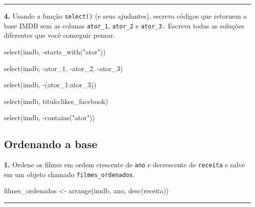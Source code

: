 \documentclass[
]{book}
\newenvironment{Shaded}{\begin{snugshade}}{\end{snugshade}}
\newcommand{\FunctionTok}[1]{\textcolor[rgb]{0.00,0.00,0.00}{#1}}
\newcommand{\NormalTok}[1]{#1}
\newcommand{\OtherTok}[1]{\textcolor[rgb]{0.56,0.35,0.01}{#1}}
\newcommand{\SpecialCharTok}[1]{\textcolor[rgb]{0.00,0.00,0.00}{#1}}
\newcommand{\StringTok}[1]{\textcolor[rgb]{0.31,0.60,0.02}{#1}}
\begin{document}
\begin{center}\rule{0.5\linewidth}{0.5pt}\end{center}

\textbf{4.} Usando a função \texttt{select()} (e seus ajudantes), escreva códigos que retornem a base IMDB sem as colunas \texttt{ator\_1}, \texttt{ator\_2} e \texttt{ator\_3.} Escreva todas as soluções diferentes que você conseguir pensar.

\begin{Shaded}
\begin{Highlighting}[]
\FunctionTok{select}\NormalTok{(imdb, }\SpecialCharTok{{-}}\FunctionTok{starts\_with}\NormalTok{(}\StringTok{"ator"}\NormalTok{))}

\FunctionTok{select}\NormalTok{(imdb, }\SpecialCharTok{{-}}\NormalTok{ator\_1, }\SpecialCharTok{{-}}\NormalTok{ator\_2, }\SpecialCharTok{{-}}\NormalTok{ator\_3)}

\FunctionTok{select}\NormalTok{(imdb, }\SpecialCharTok{{-}}\NormalTok{(ator\_1}\SpecialCharTok{:}\NormalTok{ator\_3))}

\FunctionTok{select}\NormalTok{(imdb, titulo}\SpecialCharTok{:}\NormalTok{likes\_facebook)}

\FunctionTok{select}\NormalTok{(imdb, }\SpecialCharTok{{-}}\FunctionTok{contains}\NormalTok{(}\StringTok{"ator"}\NormalTok{))}
\end{Highlighting}
\end{Shaded}

\hypertarget{ordenando-a-base-1}{%
\subsection*{Ordenando a base}\label{ordenando-a-base-1}}

\textbf{1.} Ordene os filmes em ordem crescente de \texttt{ano} e decrescente de \texttt{receita} e salve em um objeto chamado \texttt{filmes\_ordenados}.

\begin{Shaded}
\begin{Highlighting}[]
\NormalTok{filmes\_ordenados }\OtherTok{\textless{}{-}} \FunctionTok{arrange}\NormalTok{(imdb, ano, }\FunctionTok{desc}\NormalTok{(receita))}
\end{Highlighting}
\end{Shaded}

\begin{center}\rule{0.5\linewidth}{0.5pt}\end{center}
\end{document}
